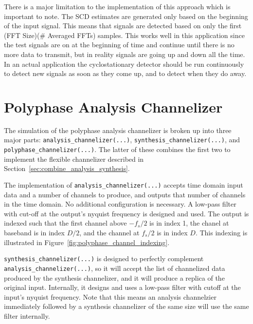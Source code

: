 \documentclass[12pt]{report}
\begin{document}
There is a major limitation to the implementation of this approach which is
important to note.  The SCD estimates are generated only based on the beginning
of the input signal. This means that signals are detected based on only the
first (FFT Size)(# Averaged FFTs) samples. This works well in this application
since the test signals are on at the beginning of time and continue until there
is no more data to transmit, but in reality signals are going up and down
all the time. In an actual application the cyclostationary detector should be
run continuously to detect new signals as soon as they come up, and to detect
when they do away.

\section{Polyphase Analysis Channelizer}
\label{sec:sim_poly}
The simulation of the polyphase analysis channelizer is broken up into three
major parts: \texttt{analysis\_channelizer(...)},
\texttt{synthesis\_channelizer(...)}, and \texttt{polyphase\_channelizer(...)}.  The
latter of these combines the first two to implement the flexible channelizer
described in Section~\ref{sec:combine_analysis_synthesis}.

The implementation of \texttt{analysis\_channelizer(...)} accepts time domain
input data and a number of channels to produce, and outputs that number of
channels in the time domain. No additional configuration is necessary.
A low-pass filter with cut-off at the output's nyquist frequency is designed and
used. The output is indexed such that the first channel above $-f_s/2$ is in
index 1, the chanel at baseband is in index $D/2$, and the channel at $f_s/2$
is in index $D$.  This indexing is illustrated in
Figure~\ref{fig:polyphase_channel_indexing}.


\texttt{synthesis\_channelizer(...)} is designed to perfectly complement
\texttt{analysis\_channelizer(...)}, so it will accept the list of channelized
data produced by the synthesis channelizer, and it will produce a replica of
the original input. Internally, it designs and uses a low-pass filter with
cutoff at the input's nyquist frequency. Note that this means an analysis
channelzier immediately followed by a synthesis channelizer of the same size
will use the same filter internally.

\end{document}
